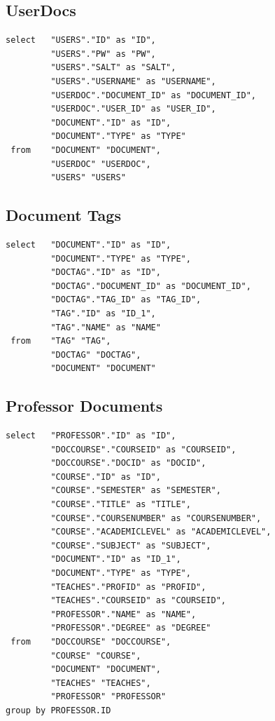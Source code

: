 \documentclass[11pt]{article}
\begin{document}
\subsection{UserDocs}
\label{sec-5-2}



\begin{verbatim}
select   "USERS"."ID" as "ID",
         "USERS"."PW" as "PW",
         "USERS"."SALT" as "SALT",
         "USERS"."USERNAME" as "USERNAME",
         "USERDOC"."DOCUMENT_ID" as "DOCUMENT_ID",
         "USERDOC"."USER_ID" as "USER_ID",
         "DOCUMENT"."ID" as "ID",
         "DOCUMENT"."TYPE" as "TYPE" 
 from    "DOCUMENT" "DOCUMENT",
         "USERDOC" "USERDOC",
         "USERS" "USERS"
\end{verbatim}
\subsection{Document Tags}
\label{sec-5-3}


\begin{verbatim}
select   "DOCUMENT"."ID" as "ID",
         "DOCUMENT"."TYPE" as "TYPE",
         "DOCTAG"."ID" as "ID",
         "DOCTAG"."DOCUMENT_ID" as "DOCUMENT_ID",
         "DOCTAG"."TAG_ID" as "TAG_ID",
         "TAG"."ID" as "ID_1",
         "TAG"."NAME" as "NAME" 
 from    "TAG" "TAG",
         "DOCTAG" "DOCTAG",
         "DOCUMENT" "DOCUMENT"
\end{verbatim}
\subsection{Professor Documents}
\label{sec-5-4}



\begin{verbatim}
select   "PROFESSOR"."ID" as "ID",
         "DOCCOURSE"."COURSEID" as "COURSEID",
         "DOCCOURSE"."DOCID" as "DOCID",
         "COURSE"."ID" as "ID",
         "COURSE"."SEMESTER" as "SEMESTER",
         "COURSE"."TITLE" as "TITLE",
         "COURSE"."COURSENUMBER" as "COURSENUMBER",
         "COURSE"."ACADEMICLEVEL" as "ACADEMICLEVEL",
         "COURSE"."SUBJECT" as "SUBJECT",
         "DOCUMENT"."ID" as "ID_1",
         "DOCUMENT"."TYPE" as "TYPE",
         "TEACHES"."PROFID" as "PROFID",
         "TEACHES"."COURSEID" as "COURSEID",
         "PROFESSOR"."NAME" as "NAME",
         "PROFESSOR"."DEGREE" as "DEGREE" 
 from    "DOCCOURSE" "DOCCOURSE",
         "COURSE" "COURSE",
         "DOCUMENT" "DOCUMENT",
         "TEACHES" "TEACHES",
         "PROFESSOR" "PROFESSOR" 
group by PROFESSOR.ID
\end{verbatim}
\end{document}
